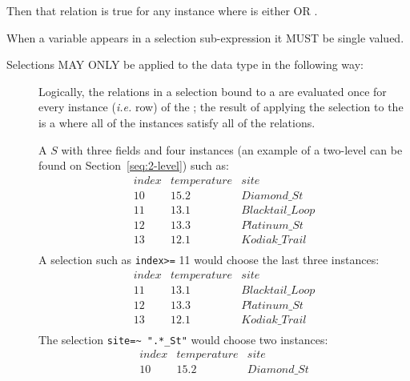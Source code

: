 \documentclass[justify]{nasa-ese}
\begin{document}
Then that relation is true for any instance where  is either
 OR .

When a variable appears in a selection sub-expression it MUST be single
valued. 

Selections MAY ONLY be applied to the \Sequence data type in the following way:

\begin{description}
  \item[\Sequence] Logically, the relations in a selection bound to a
    \Sequence are evaluated once for every instance ({\it i.e.} row) of the
    \Sequence; the result of applying the selection to the \Sequence is a
    \Sequence where all of the instances satisfy all of the relations.

    A \Sequence $S$ with three fields and four instances (an example of a two-level \Sequence can be found on Section~\ref{seq:2-level}) such as:
    \begin{displaymath}
      \begin{array}{ccc}
        index & temperature & site \\
        10 & 15.2 & Diamond\_St \\
        11 & 13.1 & Blacktail\_Loop \\
        12 & 13.3 & Platinum\_St \\
        13 & 12.1 & Kodiak\_Trail \\
      \end{array}
    \end{displaymath}
    A selection such as \verb+index>=+ 11 would choose the last three instances:
    \begin{displaymath}
      \begin{array}{ccc}
        index & temperature & site \\
        11 & 13.1 & Blacktail\_Loop \\
        12 & 13.3 & Platinum\_St \\
        13 & 12.1 & Kodiak\_Trail \\
      \end{array}
    \end{displaymath}
    The selection \verb+site=~ ".*_St"+ would choose two instances:
    \begin{displaymath}
      \begin{array}{ccc}
        index & temperature & site \\
        10 & 15.2 & Diamond\_St \\

\end{array}
\end{displaymath}
\end{description}
\end{document}
